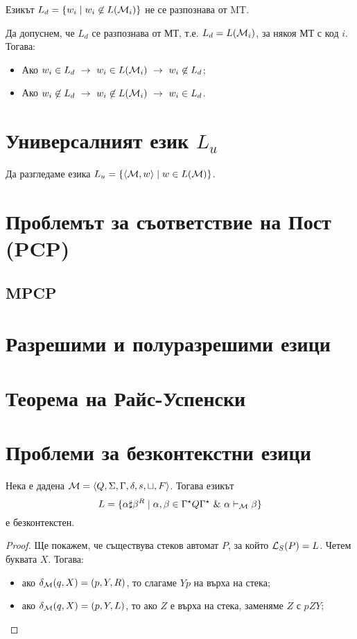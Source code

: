 \begin{framed}
  Езикът 
  $L_d = \{w_i \mid w_i \not\in L(\mathcal{M}_i)\}$ не се разпознава от MT.
\end{framed}
Да допуснем, че $L_d$ се разпознава от МТ, т.е. $L_d = L(\mathcal{M}_i)$, за някоя МТ с код $i$.
Тогава:
\begin{itemize}
\item 
  Ако
  $w_i \in L_d\ \rightarrow\ w_i \in L(\mathcal{M}_i)\ \rightarrow\ w_i \not\in L_d$;
\item
  Ако 
  $w_i \not\in L_d\ \rightarrow\ w_i \not\in L(\mathcal{M}_i)\ \rightarrow\ w_i \in L_d$.
\end{itemize}

\section{Универсалният език $L_u$}

Да разгледаме езика $L_u = \{\langle{\mathcal{M},w}\rangle \mid w\in L(\mathcal{M})\}$.

\section{Проблемът за съответствие на Пост (PCP)}

\subsection*{MPCP}

\section{Разрешими и полуразрешими езици}




\section{Теорема на Райс-Успенски}

\section{Проблеми за безконтекстни езици}

\begin{lemma}
  Нека е дадена $\mathcal{M} = \langle{Q,\Sigma,\Gamma,\delta,s,\sqcup,F}\rangle$.
  Тогава езикът 
  \[L = \{\alpha\sharp\beta^R \mid \alpha,\beta \in \Gamma^\star Q \Gamma^\star\ \&\  \alpha \vdash_{\mathcal{M}} \beta\}\]
  е безконтекстен.
\end{lemma}
\begin{proof}
  Ще покажем, че съществува стеков автомат $P$, за който $\mathcal{L}_S(P) = L$.
  Четем буквата $X$. Тогава:
  \begin{itemize}
  \item 
    ако $\delta_{\mathcal{M}}(q,X) =(p,Y,R)$, то слагаме $Yp$ на върха на стека;
  \item
    ако $\delta_{\mathcal{M}}(q,X) =(p,Y,L)$, то ако $Z$ е върха на стека, заменяме $Z$ с $pZY$;
  \end{itemize}
\end{proof}

